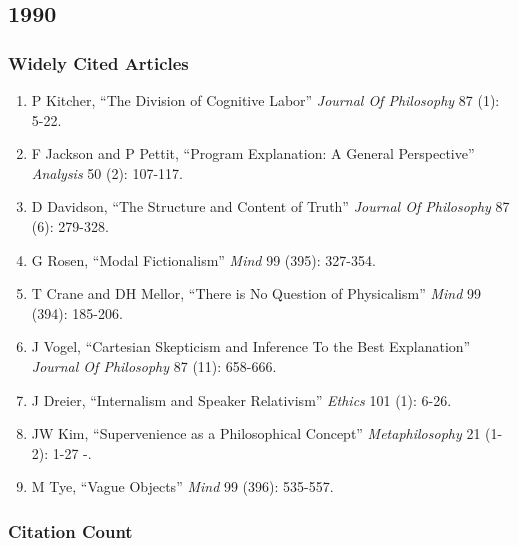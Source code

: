 \documentclass[
  10pt,
  letterpaper,
  DIV=11,
  numbers=noendperiod,
  twoside]{scrartcl}
\providecommand{\tightlist}{%
  \setlength{\itemsep}{0pt}\setlength{\parskip}{0pt}}\usepackage{longtable,booktabs,array}
\begin{document}
\newpage

\subsection{1990}\label{section-14}

\subsubsection*{Widely Cited Articles}\label{widely-cited-articles-14}

\begin{enumerate}
\def\labelenumi{\arabic{enumi}.}
\tightlist
\item
  P Kitcher, ``The Division of Cognitive Labor'' \emph{Journal Of
  Philosophy} 87 (1): 5-22.
\item
  F Jackson and P Pettit, ``Program Explanation: A General Perspective''
  \emph{Analysis} 50 (2): 107-117.
\item
  D Davidson, ``The Structure and Content of Truth'' \emph{Journal Of
  Philosophy} 87 (6): 279-328.
\item
  G Rosen, ``Modal Fictionalism'' \emph{Mind} 99 (395): 327-354.
\item
  T Crane and DH Mellor, ``There is No Question of Physicalism''
  \emph{Mind} 99 (394): 185-206.
\item
  J Vogel, ``Cartesian Skepticism and Inference To the Best
  Explanation'' \emph{Journal Of Philosophy} 87 (11): 658-666.
\item
  J Dreier, ``Internalism and Speaker Relativism'' \emph{Ethics} 101
  (1): 6-26.
\item
  JW Kim, ``Supervenience as a Philosophical Concept''
  \emph{Metaphilosophy} 21 (1-2): 1-27 -.
\item
  M Tye, ``Vague Objects'' \emph{Mind} 99 (396): 535-557.
\end{enumerate}

\subsubsection*{Citation Count}\label{citation-count-14}
\end{document}
